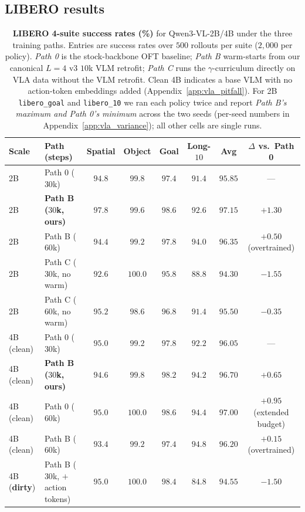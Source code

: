 \documentclass{article}
\begin{document}
\subsection{LIBERO results}
\label{sec:vla_results}

\begin{table}[t]
\caption{\textbf{LIBERO 4-suite success rates (\%)} for Qwen3-VL-2B/4B under the three training paths. Entries are success rates over $500$ rollouts per suite ($2{,}000$ per policy). \emph{Path 0} is the stock-backbone OFT baseline; \emph{Path B} warm-starts from our canonical $L{=}4$ v3 $10$k VLM retrofit; \emph{Path C} runs the $\gamma$-curriculum directly on VLA data without the VLM retrofit. Clean 4B indicates a base VLM with no action-token embeddings added (Appendix~\ref{app:vla_pitfall}). For 2B \texttt{libero\_goal} and \texttt{libero\_10} we ran each policy twice and report \emph{Path B's maximum and Path 0's minimum} across the two seeds (per-seed numbers in Appendix~\ref{app:vla_variance}); all other cells are single runs.}
\label{tab:vla_libero}
\centering\small
\setlength{\tabcolsep}{4pt}
\begin{tabular}{llcccccc}
\toprule
Scale & Path (steps) & Spatial & Object & Goal & Long-$10$ & \textbf{Avg} & $\Delta$ vs.\ Path 0 \\
\midrule
2B & Path 0 ($30$k)                & $94.8$ & $99.8$ & $97.4$ & $91.4$ & $95.85$ & --- \\
2B & \textbf{Path B ($30$k, ours)} & $\mathbf{97.8}$ & $99.6$ & $\mathbf{98.6}$ & $\mathbf{92.6}$ & $\mathbf{97.15}$ & $\mathbf{+1.30}$ \\
2B & Path B ($60$k)                & $94.4$ & $99.2$ & $97.8$ & $94.0$ & $96.35$ & $+0.50$ (overtrained) \\
2B & Path C ($30$k, no warm)       & $92.6$ & $100.0$ & $95.8$ & $88.8$ & $94.30$ & $-1.55$ \\
2B & Path C ($60$k, no warm)       & $95.2$ & $98.6$ & $96.8$ & $91.4$ & $95.50$ & $-0.35$ \\
\midrule
4B (clean) & Path 0 ($30$k)                & $95.0$ & $99.2$ & $97.8$ & $92.2$ & $96.05$ & --- \\
4B (clean) & \textbf{Path B ($30$k, ours)} & $94.6$ & $\mathbf{99.8}$ & $\mathbf{98.2}$ & $\mathbf{94.2}$ & $\mathbf{96.70}$ & $\mathbf{+0.65}$ \\
4B (clean) & Path 0 ($60$k)                & $95.0$ & $100.0$ & $98.6$ & $94.4$ & $97.00$ & $+0.95$ (extended budget) \\
4B (clean) & Path B ($60$k)                & $93.4$ & $99.2$ & $97.4$ & $94.8$ & $96.20$ & $+0.15$ (overtrained) \\
4B (\textbf{dirty}) & Path B ($30$k, $+$action tokens) & $95.0$ & $100.0$ & $98.4$ & $84.8$ & $94.55$ & $-1.50$ \\
\bottomrule
\end{tabular}
\end{table}
\end{document}
